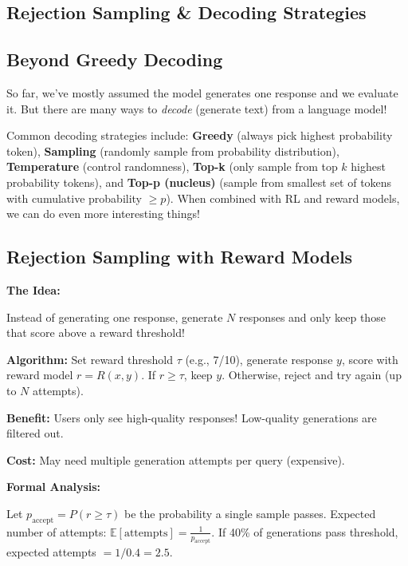 \begin{chapterenv}

\chapter{Rejection Sampling \& Decoding Strategies}

\section{Beyond Greedy Decoding}

So far, we've mostly assumed the model generates one response and we evaluate it. But there are many ways to \textit{decode} (generate text) from a language model!

Common decoding strategies include: \textbf{Greedy} (always pick highest probability token), \textbf{Sampling} (randomly sample from probability distribution), \textbf{Temperature} (control randomness), \textbf{Top-k} (only sample from top $k$ highest probability tokens), and \textbf{Top-p (nucleus)} (sample from smallest set of tokens with cumulative probability $\geq p$). When combined with RL and reward models, we can do even more interesting things!

\section{Rejection Sampling with Reward Models}

\begin{infobox}
\textbf{The Idea:}

Instead of generating one response, generate $N$ responses and only keep those that score above a reward threshold!

\textbf{Algorithm:} Set reward threshold $\tau$ (e.g., 7/10), generate response $y$, score with reward model $r = R(x, y)$. If $r \geq \tau$, keep $y$. Otherwise, reject and try again (up to $N$ attempts).

\textbf{Benefit:} Users only see high-quality responses! Low-quality generations are filtered out.

\textbf{Cost:} May need multiple generation attempts per query (expensive).
\end{infobox}

\begin{infobox}
\textbf{Formal Analysis:}

Let $p_{\text{accept}} = P(r \geq \tau)$ be the probability a single sample passes. Expected number of attempts: $\mathbb{E}[\text{attempts}] = \frac{1}{p_{\text{accept}}}$. If 40\% of generations pass threshold, expected attempts $= 1/0.4 = 2.5$.


\end{infobox}
\end{chapterenv}
